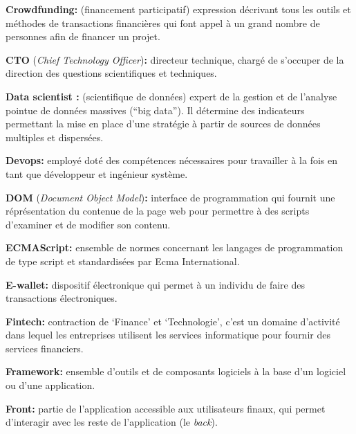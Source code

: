 \bigskip

\textbf{Crowdfunding:} (financement participatif) expression décrivant
tous les outils et méthodes de transactions financières qui font appel à
un grand nombre de personnes afin de financer un projet.

\bigskip

\textbf{CTO} (\emph{Chief Technology Officer})\textbf{:} directeur
technique, chargé de s'occuper de la direction des questions
scientifiques et techniques.

\bigskip

\textbf{Data scientist :} (scientifique de données) expert de la gestion
et de l'analyse pointue de données massives (``big data''). Il détermine
des indicateurs permettant la mise en place d'une stratégie à partir de
sources de données multiples et dispersées.

\bigskip

\textbf{Devops:} employé doté des compétences nécessaires pour
travailler à la fois en tant que développeur et ingénieur système.

\bigskip

\textbf{DOM} (\emph{Document Object Model})\textbf{:} interface de
programmation qui fournit une réprésentation du contenue de la page web
pour permettre à des scripts d'examiner et de modifier son contenu.

\bigskip

\textbf{ECMAScript:} ensemble de normes concernant les langages de
programmation de type script et standardisées par Ecma International.

\bigskip

\textbf{E-wallet:} dispositif électronique qui permet à un individu de
faire des transactions électroniques.

\bigskip

\textbf{Fintech:} contraction de `Finance' et `Technologie', c'est un
domaine d'activité dans lequel les entreprises utilisent les services
informatique pour fournir des services financiers.

\bigskip

\textbf{Framework:} ensemble d'outils et de composants logiciels à la
base d'un logiciel ou d'une application.

\bigskip

\textbf{Front:} partie de l'application accessible aux utilisateurs
finaux, qui permet d'interagir avec les reste de l'application (le
\emph{back}).

\bigskip

